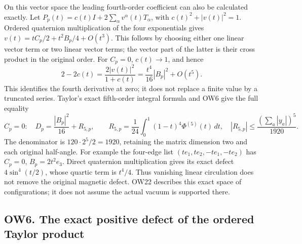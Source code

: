 \documentclass[11pt]{article}
\begin{document}
On this vector space the leading fourth-order coefficient can also be calculated exactly. Let \(P_p(t)=c(t)I+2\sum_\alpha v^\alpha(t)T_\alpha\), with \(c(t)^2+|v(t)|^2=1\). Ordered quaternion multiplication of the four exponentials gives \(v(t)=tC_p/2+t^2B_p/4+O(t^3)\). This follows by choosing either one linear vector term or two linear vector terms; the vector part of the latter is their cross product in the original order. For \(C_p=0\), \(c(t)\to1\), and hence
\[
 2-2c(t)=\frac{2|v(t)|^2}{1+c(t)}
       =\frac{t^4}{16}|B_p|^2+O(t^5).
\]
This identifies the fourth derivative at zero; it does not replace a finite value by a truncated series. Taylor's exact fifth-order integral formula and OW6 give the full equality
\[
 \boxed{C_p=0:\quad D_p=\frac{|B_p|^2}{16}+R_{5,p},\qquad
 R_{5,p}=\frac1{24}\int_0^1(1-t)^4\Phi^{(5)}(t)\,dt,
 \quad |R_{5,p}|\le\frac{(\sum_a|y_a|)^5}{1920}.}        \tag{OW22}
\]
The denominator is \(120\cdot2^5/2=1920\), retaining the matrix dimension two and each original half-angle. For example the four-edge list \((t e_1,t e_2,-t e_1,-t e_2)\) has \(C_p=0\), \(B_p=2t^2e_3\). Direct quaternion multiplication gives its exact defect \(4\sin^4(t/2)\), whose quartic term is \(t^4/4\). Thus vanishing linear circulation does not remove the original magnetic defect. OW22 describes this exact space of configurations; it does not assume the actual vacuum is supported there.

\subsection*{OW6. The exact positive defect of the ordered Taylor product}
\end{document}
